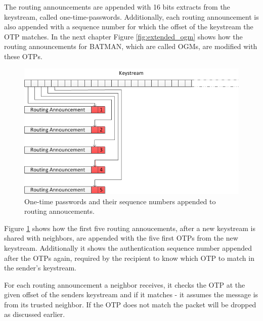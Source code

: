 The routing announcements are appended with 16 bits extracts from the keystream,
called one-time-passwords. Additionally, each routing announcement is also
appended with a sequence number for which the offset of the keystream the
\ac{OTP} matches. In the next chapter Figure \ref{fig:extended_ogm} shows how
the routing announcements for BATMAN, which are called \acp{OGM}, are modified
with these \acp{OTP}.

\begin{figure}[h]
	\centering
  	\includegraphics[width=\textwidth]{images/appending_otp_from_keystream.png}
  	\caption{One-time passwords and their sequence numbers appended to routing annoucements.}
	\label{fig:appending_otp_from_keystream}
\end{figure}

Figure \ref{fig:appending_otp_from_keystream} shows how the first five routing
annoucements, after a new keystream is shared with neighbors, are appended with
the five first \acp{OTP} from the new keystream. Additionally it shows the
authentication sequence number appended after the \acp{OTP} again, required by
the recipient to know which OTP to match in the sender's keystream.

For each routing announcement a neighbor receives, it checks the \ac{OTP} at the
given offset of the senders keystream and if it matches - it assumes the message
is from its trusted neighbor. If the \ac{OTP} does not match the packet will be
dropped as discussed earlier.


